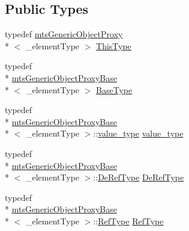 \subsection*{Public Types}
\begin{DoxyCompactItemize}
\item 
typedef \hyperlink{classmts_generic_object_proxy}{mts\-Generic\-Object\-Proxy}\\*
$<$ \-\_\-element\-Type $>$ \hyperlink{classmts_generic_object_proxy_a03ddcddca7f7515d81de5a0031d175a2}{This\-Type}
\item 
typedef \\*
\hyperlink{classmts_generic_object_proxy_base}{mts\-Generic\-Object\-Proxy\-Base}\\*
$<$ \-\_\-element\-Type $>$ \hyperlink{classmts_generic_object_proxy_a8635f88c647c718cee6f7760529c27a5}{Base\-Type}
\item 
typedef \\*
\hyperlink{classmts_generic_object_proxy_base}{mts\-Generic\-Object\-Proxy\-Base}\\*
$<$ \-\_\-element\-Type $>$\-::\hyperlink{classmts_generic_object_proxy_a4c47d4b184e02d7443de1face033af34}{value\-\_\-type} \hyperlink{classmts_generic_object_proxy_a4c47d4b184e02d7443de1face033af34}{value\-\_\-type}
\item 
typedef \\*
\hyperlink{classmts_generic_object_proxy_base}{mts\-Generic\-Object\-Proxy\-Base}\\*
$<$ \-\_\-element\-Type $>$\-::\hyperlink{classmts_generic_object_proxy_base_ac87827bf98fee558160a8985c41f4126}{De\-Ref\-Type} \hyperlink{classmts_generic_object_proxy_a5bab9bef15f9fef5e51f0060cf50e8d5}{De\-Ref\-Type}
\item 
typedef \\*
\hyperlink{classmts_generic_object_proxy_base}{mts\-Generic\-Object\-Proxy\-Base}\\*
$<$ \-\_\-element\-Type $>$\-::\hyperlink{classmts_generic_object_proxy_base_adddd01c8aea004bf5f0a5894438970c9}{Ref\-Type} \hyperlink{classmts_generic_object_proxy_aa1632a227bbb41bbfaeb4b2ccd90ed6a}{Ref\-Type}
\end{DoxyCompactItemize}
